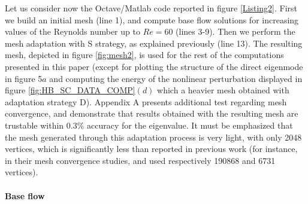 \documentclass[twocolumn,10pt]{asme2ej}
\begin{document}
Let us consider now the Octave/Matlab code reported in figure \ref{Listing2}. First we build an initial mesh (line 1), and compute base flow solutions for increasing values of the Reynolds number up to $Re = 60$ (lines 3-9).
Then we perform the mesh adaptation with S strategy, as explained previously (line 13). 
The resulting mesh, depicted in figure \ref{fig:mesh2}, is used for the rest of the computations presented in this paper (except for plotting the structure of the direct eigenmode in figure 5$a$ and computing the energy of the nonlinear perturbation displayed in figure \ref{fig:HB_SC_DATA_COMP}$(d)$ which a heavier mesh obtained with adaptation strategy D). 
Appendix A presents additional test regarding mesh convergence, and demonstrate that results obtained with the resulting mesh are trustable within $0.3\%$ accuracy for the eigenvalue. It must be emphasized  that the mesh generated through this adaptation process is very light, with only 2048 vertices, which is significantly less than reported in previous work (for instance, in their mesh convergence studies, \cite{SippLebedev} and \cite{MLugo2014} used respectively 190868  and 6731 vertices).










\paragraph{Base flow}
\end{document}

